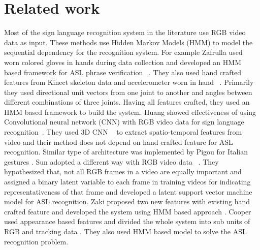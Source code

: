 \documentclass[10pt,twocolumn,letterpaper]{article}
\begin{document}
\section{Related work}
Most of the sign language recognition system in the literature use RGB video data as input. These methods use Hidden Markov Models (HMM) to model the sequential dependency for the recognition system. For example Zafrulla \etal used worn colored gloves in hands during data collection and developed an HMM based framework for ASL phrase verification ~\cite{copycat_zafrulla}. They also used hand crafted features from Kinect skeleton data and accelerometer worn in hand ~\cite{Zafrulla:2011:ASL:2070481.2070532}. Primarily they used directional unit vectors from one joint to another and angles between different combinations of three joints. Having all features crafted, they used an HMM based framework to build the system. Huang \etal showed effectiveness of using Convolutional neural network (CNN) with RGB video data for sign language recognition~\cite{7177428}. They used 3D CNN ~\cite{Ji:2013:CNN:2412386.2412939} to extract spatio-temporal features from video and their method does not depend on hand crafted feature for ASL recognition. Similar type of architecture was implemented by Pigou \etal for Italian gestures \cite{978-3-319-16178-5_40}. Sun \etal adopted a different way with RGB video data ~\cite{Sun:2015:LSV:2753829.2629481}. They hypothesized that, not all RGB frames in a video are equally important and assigned a binary latent variable to each frame in training videos for indicating representativeness of that frame and developed a latent support vector machine model for ASL recognition. Zaki \etal proposed two new features with existing hand crafted feature and developed the system using HMM based approach \cite{ZAKI2011572}. Cooper \etal used appearance based features and divided the whole system into sub units of RGB and tracking data \cite{Cooper2017}. They also used HMM based model to solve the ASL recognition problem. 
\end{document}
